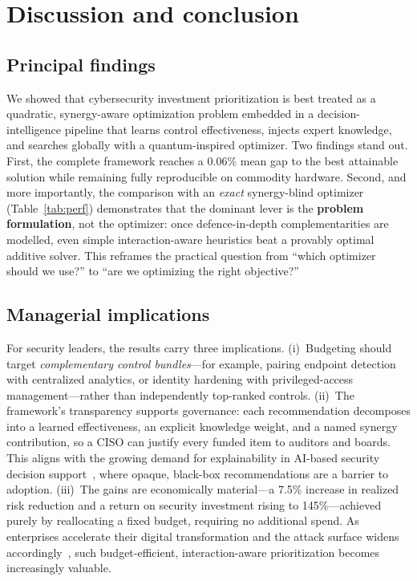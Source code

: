 \documentclass[preprint,12pt]{elsarticle}
\begin{document}
\section{Discussion and conclusion}
\label{sec:disc}

\subsection{Principal findings}
We showed that cybersecurity investment prioritization is best treated as a quadratic,
synergy-aware optimization problem embedded in a decision-intelligence pipeline that
learns control effectiveness, injects expert knowledge, and searches globally with a
quantum-inspired optimizer. Two findings stand out. First, the complete framework reaches
a 0.06\% mean gap to the best attainable solution while remaining fully reproducible on
commodity hardware. Second, and more importantly, the comparison with an \emph{exact}
synergy-blind optimizer (Table~\ref{tab:perf}) demonstrates that the dominant lever is
the \textbf{problem formulation}, not the optimizer: once defence-in-depth
complementarities are modelled, even simple interaction-aware heuristics beat a provably
optimal additive solver. This reframes the practical question from ``which optimizer
should we use?'' to ``are we optimizing the right objective?''

\subsection{Managerial implications}
For security leaders, the results carry three implications. (i)~Budgeting should target
\emph{complementary control bundles}---for example, pairing endpoint detection with
centralized analytics, or identity hardening with privileged-access management---rather
than independently top-ranked controls. (ii)~The framework's transparency supports
governance: each recommendation decomposes into a learned effectiveness, an explicit
knowledge weight, and a named synergy contribution, so a CISO can justify every funded
item to auditors and boards. This aligns with the growing demand for explainability in
AI-based security decision support~\cite{chakraborty2024}, where opaque, black-box
recommendations are a barrier to adoption. (iii)~The gains are economically material---a
7.5\% increase in realized risk reduction and a return on security investment rising to
145\%---achieved purely by reallocating a fixed budget, requiring no additional spend. As
enterprises accelerate their digital transformation and the attack surface widens
accordingly~\cite{teng2024}, such budget-efficient, interaction-aware prioritization
becomes increasingly valuable.
\end{document}
